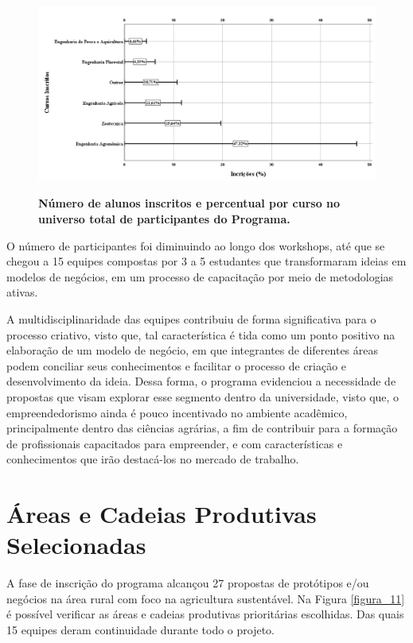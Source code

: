 \begin{figure}[H]
\caption{\textbf{Número de alunos inscritos e percentual por curso no universo total de participantes do Programa.}}
\centering
\includegraphics[scale=0.3]{Imagens/inscritos.png}
\label{figura_10}
\end{figure}

O número de participantes foi diminuindo ao longo dos workshops, até que se chegou a 15 equipes compostas por 3 a 5 estudantes que transformaram ideias em modelos de negócios, em um processo de capacitação por meio de metodologias ativas. 

A multidisciplinaridade das equipes contribuiu de forma significativa para o processo criativo, visto que, tal característica é tida como um ponto positivo na elaboração de um modelo de negócio, em que integrantes de diferentes áreas podem conciliar seus conhecimentos e facilitar o processo de criação e desenvolvimento da ideia. Dessa forma, o programa evidenciou a necessidade de propostas que visam explorar esse segmento dentro da universidade, visto que, o empreendedorismo ainda é pouco incentivado no ambiente acadêmico, principalmente dentro das ciências agrárias, a fim de contribuir para a formação de profissionais capacitados para empreender, e com características e conhecimentos que irão destacá-los no mercado de trabalho.

\section{Áreas e Cadeias Produtivas Selecionadas}

A fase de inscrição do programa alcançou 27 propostas de protótipos e/ou negócios na área rural com foco na agricultura sustentável. Na Figura \ref{figura_11} é possível verificar as áreas e cadeias produtivas prioritárias escolhidas. Das quais 15 equipes deram continuidade durante todo o projeto.

